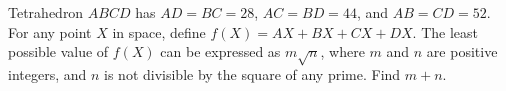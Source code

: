 Tetrahedron $ABCD$ has $AD=BC=28$, $AC=BD=44$, and $AB=CD=52$. For any point $X$ in space, define $f\left(X\right)=AX+BX+CX+DX$. The least possible value of $f\left(X\right)$ can be expressed as $m\sqrt{n}$, where $m$ and $n$ are positive integers, and $n$ is not divisible by the square of any prime. Find $m+n$.